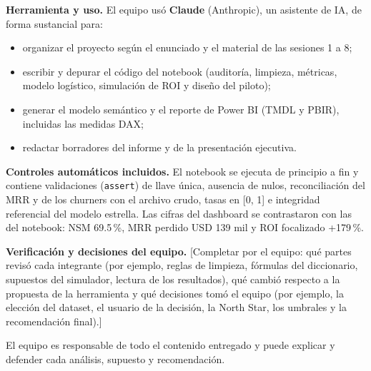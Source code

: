 \textbf{Herramienta y uso.} El equipo usó \textbf{Claude} (Anthropic), un asistente de IA, de forma sustancial para:
\begin{itemize}
  \item organizar el proyecto según el enunciado y el material de las sesiones 1 a 8;
  \item escribir y depurar el código del notebook (auditoría, limpieza, métricas, modelo logístico, simulación de ROI y diseño del piloto);
  \item generar el modelo semántico y el reporte de Power BI (TMDL y PBIR), incluidas las medidas DAX;
  \item redactar borradores del informe y de la presentación ejecutiva.
\end{itemize}

\textbf{Controles automáticos incluidos.} El notebook se ejecuta de principio a fin y contiene validaciones (\texttt{assert}) de llave única, ausencia de nulos, reconciliación del MRR y de los churners con el archivo crudo, tasas en [0, 1] e integridad referencial del modelo estrella. Las cifras del dashboard se contrastaron con las del notebook: NSM 69.5\,\%, MRR perdido USD 139 mil y ROI focalizado +179\,\%.

\textbf{Verificación y decisiones del equipo.} [Completar por el equipo: qué partes revisó cada integrante (por ejemplo, reglas de limpieza, fórmulas del diccionario, supuestos del simulador, lectura de los resultados), qué cambió respecto a la propuesta de la herramienta y qué decisiones tomó el equipo (por ejemplo, la elección del dataset, el usuario de la decisión, la North Star, los umbrales y la recomendación final).]

El equipo es responsable de todo el contenido entregado y puede explicar y defender cada análisis, supuesto y recomendación.
